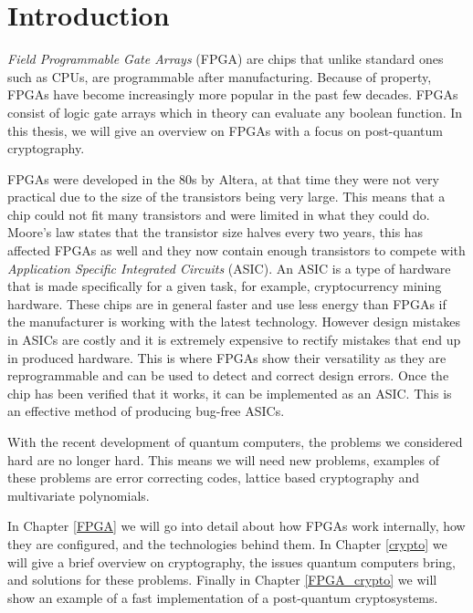 \chapter{Introduction\label{intro}}

\textit{Field Programmable Gate Arrays} (FPGA) are chips that unlike standard
ones such as CPUs, are programmable after manufacturing. Because of property,
FPGAs have become increasingly more popular in the past few decades. FPGAs
consist of logic gate arrays which in theory can evaluate any boolean function.
In this thesis, we will give an overview on FPGAs with a focus on post-quantum
cryptography.

FPGAs were developed in the 80s by Altera, at that time they were not very
practical due to the size of the transistors being very large. This means that
a chip could not fit many transistors and were limited in what they could do.
Moore's law states that the transistor size halves every two years, this has
affected FPGAs as well and they now contain enough transistors to compete with
\textit{Application Specific Integrated Circuits} (ASIC). An ASIC is a type of
hardware that is made specifically for a given task, for example,
cryptocurrency mining hardware. These chips are in general faster and use less
energy than FPGAs if the manufacturer is working with the latest technology.
However design mistakes in ASICs are costly and it is extremely expensive to
rectify mistakes that end up in produced hardware. This is where FPGAs show
their versatility as they are reprogrammable and can be used to detect and
correct design errors. Once the chip has been verified that it works, it can be
implemented as an ASIC. This is an effective method of producing bug-free
ASICs.

With the recent development of quantum computers, the problems we considered
hard are no longer hard. This means we will need new problems, examples of
these problems are error correcting codes, lattice based cryptography and
multivariate polynomials.

In Chapter \ref{FPGA} we will go into detail about how FPGAs work internally,
how they are configured, and the technologies behind them. In Chapter
\ref{crypto} we will give a brief overview on cryptography, the issues quantum
computers bring, and solutions for these problems. Finally in Chapter
\ref{FPGA_crypto} we will show an example of a fast implementation of a
post-quantum cryptosystems.
